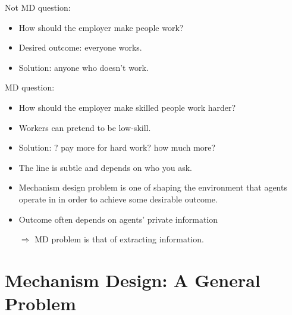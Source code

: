 \documentclass[english,handout,10pt]{beamer}		%
\def\lyxframeend{} %
\begin{document}
\begin{exampleblock}{Not MD question:}
	\begin{itemize}
		\item How should the employer \alert<1>{make people work}?
		\item Desired outcome: everyone works.
		\item Solution:  anyone who doesn't work.
	\end{itemize}
\end{exampleblock}
\pause
\begin{exampleblock}{MD question:}
	\begin{itemize}
		\item How should the employer \alert<2>{make skilled people work harder}?
		\item Workers can pretend to be low-skill.
		\item Solution: ? pay more for hard work? how much more?
	\end{itemize}
\end{exampleblock}
\pause
\begin{itemize}
\item The line is subtle and depends on who you ask.
\end{itemize}
\lyxframeend


\begin{itemize}
	\item Mechanism design problem is one of shaping the environment that agents operate in in order to achieve some desirable outcome.
	\item Outcome often depends on agents' private information 
	
	$\Rightarrow$ MD problem is that of extracting information.
\end{itemize}
\lyxframeend




\section{Mechanism Design: A General Problem}
\end{document}
